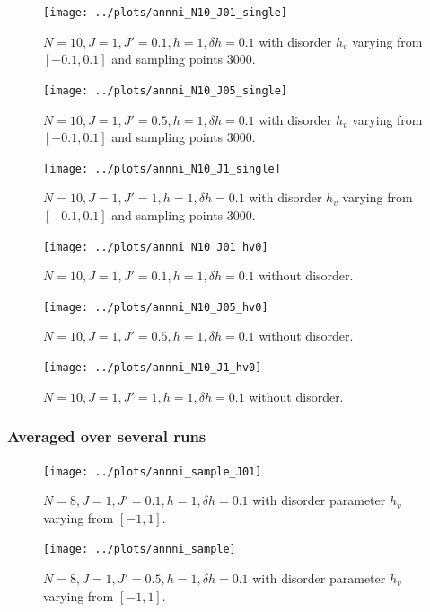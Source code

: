 \documentclass[a4paper]{article}
\begin{document}
\begin{figure}[h!]
  \centering
  \texttt{[image: ../plots/annni\_N10\_J01\_single]}
  \caption{$N = 10, J = 1, J'=0.1, h = 1, \delta h = 0.1$ with disorder $h_v$ varying from $[-0.1,0.1]$ and sampling points 3000.}
  \label{fig:}
\end{figure}

\begin{figure}[h!]
  \centering
  \texttt{[image: ../plots/annni\_N10\_J05\_single]}
  \caption{$N = 10, J = 1, J'=0.5, h = 1, \delta h = 0.1$ with disorder $h_v$ varying from $[-0.1,0.1]$ and sampling points 3000.}
  \label{fig:}
\end{figure}

\begin{figure}[h!]
  \centering
  \texttt{[image: ../plots/annni\_N10\_J1\_single]}
  \caption{$N = 10, J = 1, J'=1, h = 1, \delta h = 0.1$ with disorder $h_v$ varying from $[-0.1,0.1]$ and sampling points 3000.}
  \label{fig:}
\end{figure}

\begin{figure}[h!]
  \centering
  \texttt{[image: ../plots/annni\_N10\_J01\_hv0]}
  \caption{$N = 10, J = 1, J'=0.1, h = 1, \delta h = 0.1$ without disorder.}
  \label{fig:}
\end{figure}

\begin{figure}[h!]
  \centering
  \texttt{[image: ../plots/annni\_N10\_J05\_hv0]}
  \caption{$N = 10, J = 1, J'=0.5, h = 1, \delta h = 0.1$ without disorder.}
  \label{fig:}
\end{figure}

\begin{figure}[h!]
  \centering
  \texttt{[image: ../plots/annni\_N10\_J1\_hv0]}
  \caption{$N = 10, J = 1, J'=1, h = 1, \delta h = 0.1$ without disorder.}
  \label{fig:}
\end{figure}

\newpage
\subsubsection{Averaged over several runs}
\begin{figure}[h!]
  \centering
  \texttt{[image: ../plots/annni\_sample\_J01]}
  \caption{$N = 8, J = 1,  J'=0.1, h = 1, \delta h = 0.1$ with disorder parameter $h_v$ varying from $[-1,1]$.}
  \label{fig:}
\end{figure}

\begin{figure}[h!]
  \centering
  \texttt{[image: ../plots/annni\_sample]}
  \caption{$N = 8, J = 1,  J'=0.5, h = 1, \delta h = 0.1$ with disorder parameter $h_v$ varying from $[-1,1]$.}
  \label{fig:}
\end{figure}
\end{document}
